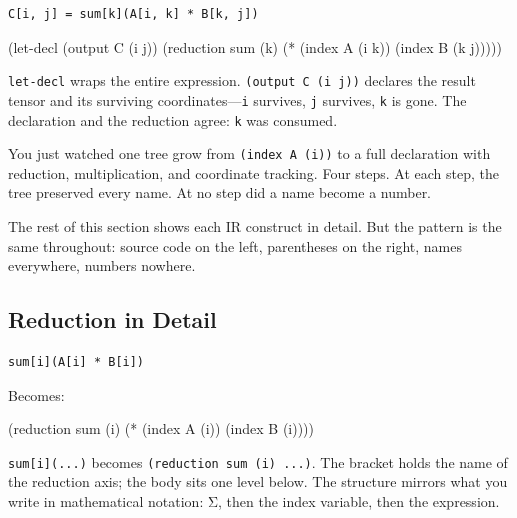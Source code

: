 \documentclass[11pt,titlepage]{article}
\newenvironment{Shaded}{}{}
\newcommand{\NormalTok}[1]{#1}
\newcommand{\OperatorTok}[1]{\textcolor[rgb]{0.40,0.40,0.40}{#1}}
\begin{document}
\begin{verbatim}
C[i, j] = sum[k](A[i, k] * B[k, j])
\end{verbatim}

\begin{Shaded}
\begin{Highlighting}[]
\NormalTok{(let-decl (output C (i j))}
\NormalTok{  (reduction sum (k)}
\NormalTok{    (}\OperatorTok{*}\NormalTok{ (index A (i k)) (index B (k j)))))}
\end{Highlighting}
\end{Shaded}

\texttt{let-decl} wraps the entire expression.
\texttt{(output\ C\ (i\ j))} declares the result tensor and its
surviving coordinates---\texttt{i} survives, \texttt{j} survives,
\texttt{k} is gone. The declaration and the reduction agree: \texttt{k}
was consumed.

You just watched one tree grow from \texttt{(index\ A\ (i))} to a full
declaration with reduction, multiplication, and coordinate tracking.
Four steps. At each step, the tree preserved every name. At no step did
a name become a number.

The rest of this section shows each IR construct in detail. But the
pattern is the same throughout: source code on the left, parentheses on
the right, names everywhere, numbers nowhere.

\vspace{2em}

\hypertarget{reduction-in-detail}{%
\subsection{Reduction in Detail}\label{reduction-in-detail}}

\begin{verbatim}
sum[i](A[i] * B[i])
\end{verbatim}

Becomes:

\begin{Shaded}
\begin{Highlighting}[]
\NormalTok{(reduction sum (i)}
\NormalTok{  (}\OperatorTok{*}\NormalTok{ (index A (i)) (index B (i))))}
\end{Highlighting}
\end{Shaded}

\texttt{sum{[}i{]}(...)} becomes \texttt{(reduction\ sum\ (i)\ ...)}.
The bracket holds the name of the reduction axis; the body sits one
level below. The structure mirrors what you write in mathematical
notation: Σ, then the index variable, then the expression.
\end{document}
